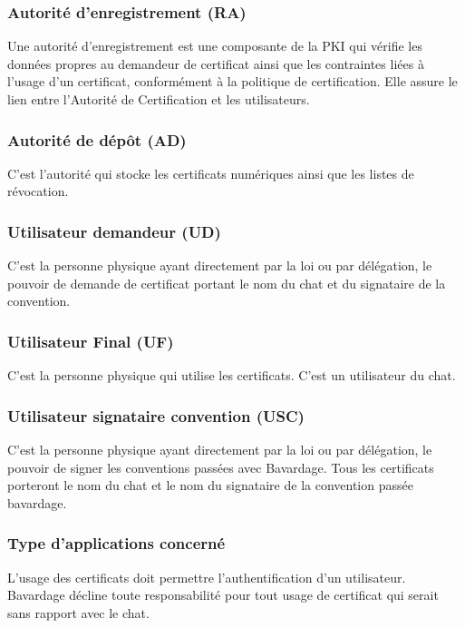 \documentclass[a4paper,11pt,french]{book}
\begin{document}
\subsubsection{Autorité d'enregistrement (RA)}

Une autorité d’enregistrement est une composante de la PKI qui vérifie les données propres au demandeur de certificat ainsi que les contraintes liées à l’usage d’un certificat, conformément à la politique de certification. Elle assure le lien entre l'Autorité de Certification et les utilisateurs. 

\subsubsection{Autorité de dépôt (AD)}
C'est l'autorité qui stocke les certificats numériques ainsi que les listes de révocation.

\subsubsection{ Utilisateur demandeur (UD)}

C'est la personne physique ayant directement par la loi ou par délégation, le pouvoir de demande de certificat portant le nom du chat et du signataire de la convention.

\subsubsection{ Utilisateur Final (UF)}

C'est la personne physique qui utilise les certificats. C'est un utilisateur du chat.

\subsubsection{Utilisateur signataire convention (USC)}

C'est la personne physique ayant directement par la loi ou par délégation, le pouvoir de signer les conventions passées avec Bavardage. Tous les certificats porteront le nom du chat et le nom du signataire de la convention passée bavardage. 
		
\subsubsection{Type d'applications concerné}

L'usage des certificats doit permettre l'authentification d'un utilisateur. Bavardage décline toute responsabilité pour tout usage de certificat qui serait sans rapport avec le chat.
\end{document}
